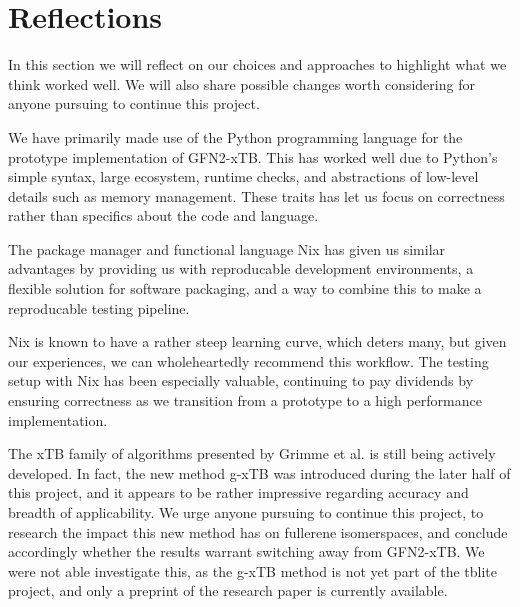 \chapter{Reflections}\label{sec:reflection}

In this section we will reflect on our choices and approaches to highlight what we think worked well. We will also share possible changes worth considering for anyone pursuing to continue this project.%

We have primarily made use of the Python programming language for the prototype implementation of GFN2-xTB. This has worked well due to Python's simple syntax, large ecosystem, runtime checks, and abstractions of low-level details such as memory management. These traits has let us focus on correctness rather than specifics about the code and language.

The package manager and functional language Nix has given us similar advantages by providing us with reproducable development environments, a flexible solution for software packaging, and a way to combine this to make a reproducable testing pipeline. %

Nix is known to have a rather steep learning curve, which deters many, but given our experiences, we can wholeheartedly recommend this workflow. The testing setup with Nix has been especially valuable, continuing to pay dividends by ensuring correctness as we transition from a prototype to a high performance implementation.

The xTB family of algorithms presented by Grimme et al. is still being actively developed. In fact, the new method g-xTB was introduced during the later half of this project, and it appears to be rather impressive regarding accuracy and breadth of applicability. We urge anyone pursuing to continue this project, to research the impact this new method has on fullerene isomerspaces, and conclude accordingly whether the results warrant switching away from GFN2-xTB. We were not able investigate this, as the g-xTB method is not yet part of the tblite project, and only a preprint of the research paper is currently available.%
